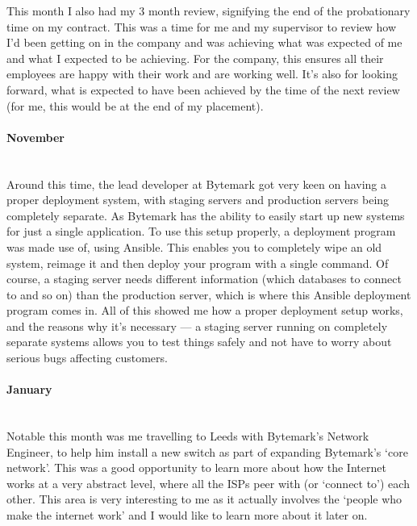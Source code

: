 \documentclass[12pt,a4paper]{article}
\newcommand{\paragraphnl}[1]{\paragraph{#1}\mbox{}\\}
\begin{document}
	This month I also had my 3 month review, signifying the end of the
	probationary time on my contract. This was a time for me and my supervisor
	to review how I'd been getting on in the company and was achieving what was
	expected of me and what I expected to be achieving. For the company, this
	ensures all their employees are happy with their work and are working well.
	It's also for looking forward, what is expected to have been achieved by
	the time of the next review (for me, this would be at the end of my
	placement).

\paragraphnl{November}
	Around this time, the lead developer at Bytemark got very keen on having a
	proper deployment system, with staging servers and production servers
	being completely separate. As Bytemark has the ability to easily start up
	new systems for just a single application. To use this setup properly,
	a deployment program was made use of, using Ansible. This enables you to
	completely wipe an old system, reimage it and then deploy your program with
	a single command. Of course, a staging server needs different information
	(which databases to connect to and so on) than the production server, which
	is where this Ansible deployment program comes in. All of this showed me
	how a proper deployment setup works, and the reasons why it's necessary ---
	a staging server running on completely separate systems allows you to test
	things safely and not have to worry about serious bugs affecting customers.


\paragraphnl{January}
	Notable this month was me travelling to Leeds with Bytemark's Network
	Engineer, to help him install a new switch as part of expanding Bytemark's
	`core network'. This was a good opportunity to learn more about how the
	Internet works at a very abstract level, where all the ISPs peer with (or
	`connect to') each other. This area is very interesting to me as it
	actually involves the `people who make the internet work' and I would like
	to learn more about it later on.

\end{document}
